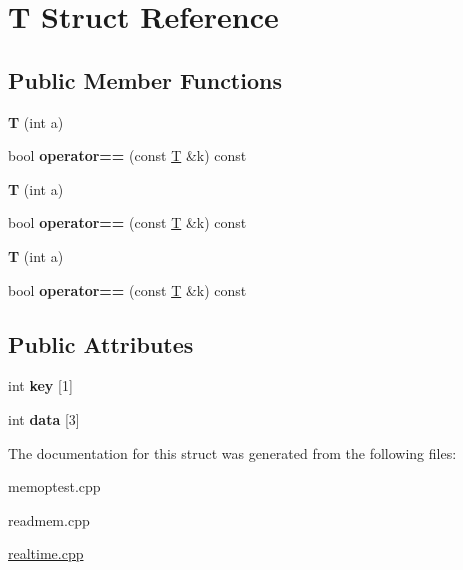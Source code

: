 \hypertarget{struct_t}{}\section{T Struct Reference}
\label{struct_t}
\subsection*{Public Member Functions}
\begin{DoxyCompactItemize}
\item 
\mbox{\label{struct_t_a8f5edc9a39e3241d33ae54a5029b0043}} 
{\bfseries T} (int a)
\item 
\mbox{\label{struct_t_a548f7076ea10db21bc73979dd9735f47}} 
bool {\bfseries operator==} (const \mbox{\hyperlink{struct_t}{T}} \&k) const
\item 
\mbox{\label{struct_t_a8f5edc9a39e3241d33ae54a5029b0043}} 
{\bfseries T} (int a)
\item 
\mbox{\label{struct_t_a548f7076ea10db21bc73979dd9735f47}} 
bool {\bfseries operator==} (const \mbox{\hyperlink{struct_t}{T}} \&k) const
\item 
\mbox{\label{struct_t_a8f5edc9a39e3241d33ae54a5029b0043}} 
{\bfseries T} (int a)
\item 
\mbox{\label{struct_t_a548f7076ea10db21bc73979dd9735f47}} 
bool {\bfseries operator==} (const \mbox{\hyperlink{struct_t}{T}} \&k) const
\end{DoxyCompactItemize}
\subsection*{Public Attributes}
\begin{DoxyCompactItemize}
\item 
\mbox{\label{struct_t_a910785bad87bed60eccfe8fec17e55ec}} 
int {\bfseries key} \mbox{[}1\mbox{]}
\item 
\mbox{\label{struct_t_a07547b3bcc7ade309011aaa5a56ec814}} 
int {\bfseries data} \mbox{[}3\mbox{]}
\end{DoxyCompactItemize}


The documentation for this struct was generated from the following files\+:\begin{DoxyCompactItemize}
\item 
memoptest.\+cpp\item 
readmem.\+cpp\item 
\mbox{\hyperlink{realtime_8cpp}{realtime.\+cpp}}\end{DoxyCompactItemize}
